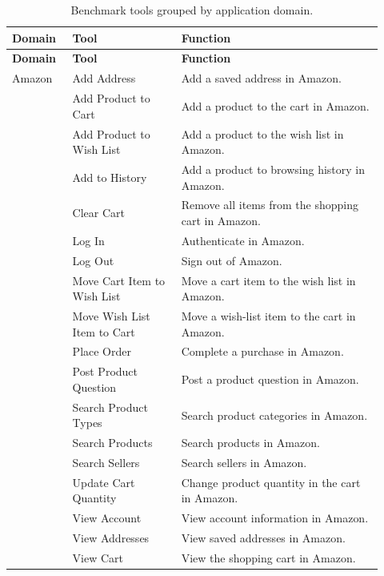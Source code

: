 \par\medskip
\begingroup
\footnotesize
\setlength{\LTpre}{8pt}
\setlength{\LTpost}{0pt}
\setlength{\tabcolsep}{3pt}
\begin{longtable}{@{}p{0.15\linewidth}p{0.27\linewidth}p{0.50\linewidth}@{}}
\caption{Benchmark tools grouped by application domain.}
\label{tab:benchmark_tools}\\
\toprule
\textbf{Domain} & \textbf{Tool} & \textbf{Function} \\
\midrule
\endfirsthead

\toprule
\textbf{Domain} & \textbf{Tool} & \textbf{Function} \\
\midrule
\endhead

\endfoot

\bottomrule
\endlastfoot

Amazon & Add Address & Add a saved address in Amazon. \\
 & Add Product to Cart & Add a product to the cart in Amazon. \\
 & Add Product to Wish List & Add a product to the wish list in Amazon. \\
 & Add to History & Add a product to browsing history in Amazon. \\
 & Clear Cart & Remove all items from the shopping cart in Amazon. \\
 & Log In & Authenticate in Amazon. \\
 & Log Out & Sign out of Amazon. \\
 & Move Cart Item to Wish List & Move a cart item to the wish list in Amazon. \\
 & Move Wish List Item to Cart & Move a wish-list item to the cart in Amazon. \\
 & Place Order & Complete a purchase in Amazon. \\
 & Post Product Question & Post a product question in Amazon. \\
 & Search Product Types & Search product categories in Amazon. \\
 & Search Products & Search products in Amazon. \\
 & Search Sellers & Search sellers in Amazon. \\
 & Update Cart Quantity & Change product quantity in the cart in Amazon. \\
 & View Account & View account information in Amazon. \\
 & View Addresses & View saved addresses in Amazon. \\
 & View Cart & View the shopping cart in Amazon. \\

\end{longtable}
